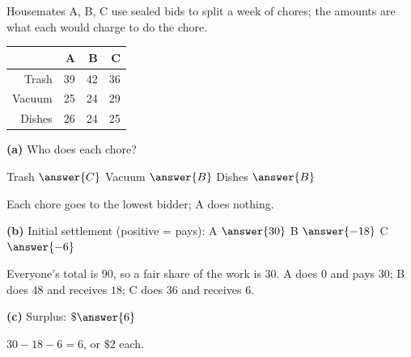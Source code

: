 \documentclass[12pt]{ximera}
\begin{document}
\begin{problem}
Housemates A, B, C use sealed bids to split a week of chores; the amounts are what each
would charge to do the chore.
\begin{center}
\begin{tabular}{r|rrr}
 & A & B & C\\\hline
Trash & 39 & 42 & 36\\
Vacuum & 25 & 24 & 29\\
Dishes & 26 & 24 & 25
\end{tabular}
\end{center}

\begin{prompt}
\textbf{(a)} Who does each chore?

Trash $\answer{C}$ \quad Vacuum $\answer{B}$ \quad Dishes $\answer{B}$
\begin{feedback}
Each chore goes to the lowest bidder; A does nothing.
\end{feedback}
\end{prompt}

\begin{prompt}
\textbf{(b)} Initial settlement (positive = pays): A $\answer{30}$ \quad B $\answer{-18}$
\quad C $\answer{-6}$
\begin{feedback}
Everyone's total is $90$, so a fair share of the work is $30$. A does $0$ and pays $30$;
B does $48$ and receives $18$; C does $36$ and receives $6$.
\end{feedback}
\end{prompt}

\begin{prompt}
\textbf{(c)} Surplus: $\$\answer{6}$
\begin{feedback}
$30-18-6=6$, or $\$2$ each.
\end{feedback}
\end{prompt}
\end{problem}
\end{document}
